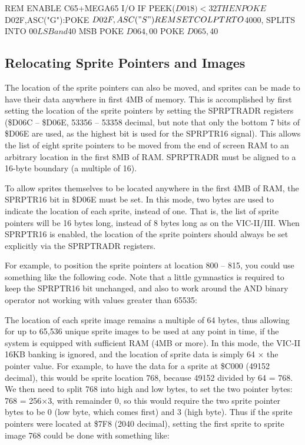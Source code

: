 \begin{screencode}
REM ENABLE C65+MEGA65 I/O
IF PEEK($D018)<32 THEN POKE $D02F,ASC("G"):POKE $D02F,ASC("S")
REM SET COLPTR TO $4000, SPLITS INTO $00 LSB and $40 MSB
POKE $D064,$00
POKE $D065,$40
\end{screencode}

\subsection{Relocating Sprite Pointers and Images}

The location of the sprite pointers can also be moved, and sprites can be made to have their data anywhere in first 4MB of memory.
This is accomplished by first setting the location of the sprite pointers by setting the SPRPTRADR registers (\$D06C -- \$D06E, 53356 -- 53358 decimal, but note that only the bottom 7 bits of \$D06E are used, as the highest bit is used for the SPRPTR16 signal).  This allows the list of
eight sprite pointers to be moved from the end of screen RAM to an arbitrary location in the first 8MB of RAM. SPRPTRADR must be aligned to a 16-byte boundary (a multiple of 16).

To allow sprites themselves
to be located anywhere in the first 4MB of RAM, the SPRPTR16 bit in \$D06E must be set. In this mode, two bytes are used to indicate the
location of each sprite, instead of one. That is, the list of sprite pointers will be 16 bytes long, instead of 8 bytes long as on the VIC-II/III.  When SPRPTR16 is enabled, the location of the sprite pointers should always be set explicitly via the SPRPTRADR registers.

For example, to position the sprite pointers at location 800 -- 815, you could use something like the following code. Note that a little gymnastics is required to keep the SPRPTR16 bit unchanged, and also to work around the AND binary operator not working with values greater than 65535:


The location of each sprite image remains a multiple of 64 bytes, thus allowing for up to 65,536 unique sprite images
to be used at any point in time, if the system is equipped with sufficient RAM (4MB or more).  In this mode, the VIC-II 16KB banking is ignored, and the location of sprite data is simply 64 $\times$ the pointer value.  For example, to have the data for a sprite at \$C000 (49152 decimal), this would be sprite location 768, because 49152 divided by 64 = 768.  We then need to split 768 into high and low bytes, to set the two pointer bytes: 768 = 256$\times$3, with remainder 0, so this would require the two sprite pointer bytes to be 0 (low byte, which comes first) and 3 (high byte).  Thus if the sprite pointers were located at \$7F8 (2040 decimal), setting the first sprite to sprite image 768 could be done with something like:

